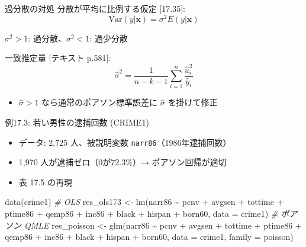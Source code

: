 \documentclass[
  ignorenonframetext,
]{beamer}
\newenvironment{Shaded}{\begin{snugshade}}{\end{snugshade}}
\newcommand{\AttributeTok}[1]{\textcolor[rgb]{0.77,0.63,0.00}{#1}}
\newcommand{\CommentTok}[1]{\textcolor[rgb]{0.56,0.35,0.01}{\textit{#1}}}
\newcommand{\FunctionTok}[1]{\textcolor[rgb]{0.00,0.00,0.00}{#1}}
\newcommand{\NormalTok}[1]{#1}
\newcommand{\OtherTok}[1]{\textcolor[rgb]{0.56,0.35,0.01}{#1}}
\newcommand{\SpecialCharTok}[1]{\textcolor[rgb]{0.00,0.00,0.00}{#1}}
\providecommand{\tightlist}{%
  \setlength{\itemsep}{0pt}\setlength{\parskip}{0pt}}
\begin{document}
\begin{frame}{過分散の対処}
\protect\hypertarget{ux904eux5206ux6563ux306eux5bfeux51e6}{}
分散が平均に比例する仮定 {[}17.35{]}:
\[\text{Var}(y|\mathbf{x}) = \sigma^2 E(y|\mathbf{x})\]

\(\sigma^2 > 1\): 過分散、\(\sigma^2 < 1\): 過少分散

一致推定量 {[}テキスト p.581{]}:
\[\hat{\sigma}^2 = \frac{1}{n-k-1}\sum_{i=1}^n \frac{\hat{u}_i^2}{\hat{y}_i}\]

\begin{itemize}
\tightlist
\item
  \(\hat{\sigma} > 1\) なら通常のポアソン標準誤差に \(\hat{\sigma}\)
  を掛けて修正
\end{itemize}
\end{frame}

\begin{frame}[fragile]{例17.3: 若い男性の逮捕回数 (CRIME1)}
\protect\hypertarget{ux4f8b17.3-ux82e5ux3044ux7537ux6027ux306eux902eux6355ux56deux6570-crime1}{}
\begin{itemize}
\tightlist
\item
  データ: 2,725 人、被説明変数 \texttt{narr86}（1986年逮捕回数）
\item
  1,970 人が逮捕ゼロ（0が72.3\%）→ ポアソン回帰が適切
\item
  表 17.5 の再現
\end{itemize}

\footnotesize

\begin{Shaded}
\begin{Highlighting}[]
\FunctionTok{data}\NormalTok{(crime1)}
\CommentTok{\# OLS}
\NormalTok{res\_ols173 }\OtherTok{\textless{}{-}} \FunctionTok{lm}\NormalTok{(narr86 }\SpecialCharTok{\textasciitilde{}}\NormalTok{ pcnv }\SpecialCharTok{+}\NormalTok{ avgsen }\SpecialCharTok{+}\NormalTok{ tottime }\SpecialCharTok{+}\NormalTok{ ptime86 }\SpecialCharTok{+}
\NormalTok{                   qemp86 }\SpecialCharTok{+}\NormalTok{ inc86 }\SpecialCharTok{+}\NormalTok{ black }\SpecialCharTok{+}\NormalTok{ hispan }\SpecialCharTok{+}\NormalTok{ born60,}
                 \AttributeTok{data =}\NormalTok{ crime1)}
\CommentTok{\# ポアソン QMLE}
\NormalTok{res\_poisson }\OtherTok{\textless{}{-}} \FunctionTok{glm}\NormalTok{(narr86 }\SpecialCharTok{\textasciitilde{}}\NormalTok{ pcnv }\SpecialCharTok{+}\NormalTok{ avgsen }\SpecialCharTok{+}\NormalTok{ tottime }\SpecialCharTok{+}\NormalTok{ ptime86 }\SpecialCharTok{+}
\NormalTok{                     qemp86 }\SpecialCharTok{+}\NormalTok{ inc86 }\SpecialCharTok{+}\NormalTok{ black }\SpecialCharTok{+}\NormalTok{ hispan }\SpecialCharTok{+}\NormalTok{ born60,}
                   \AttributeTok{data =}\NormalTok{ crime1, }\AttributeTok{family =}\NormalTok{ poisson)}
\end{Highlighting}
\end{Shaded}

\normalsize
\end{frame}
\end{document}
